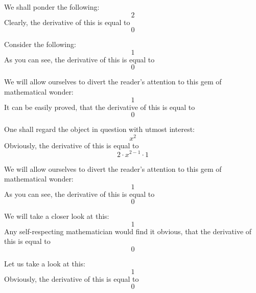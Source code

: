 \documentclass{article}
\begin{document}
We shall ponder the following:
\begin{equation}
2 
\end{equation}
Clearly, the derivative of this is equal to
\begin{equation}
0 
\end{equation}

Consider the following:
\begin{equation}
1 
\end{equation}
As you can see, the derivative of this is equal to
\begin{equation}
0 
\end{equation}

We will allow ourselves to divert the reader's attention to this gem of mathematical wonder:
\begin{equation}
1 
\end{equation}
It can be easily proved, that the derivative of this is equal to
\begin{equation}
0 
\end{equation}

One shall regard the object in question with utmost interest:
\begin{equation}
x ^{2 } 
\end{equation}
Obviously, the derivative of this is equal to
\begin{equation}
2 \cdot x ^{2 - 1 } \cdot 1 
\end{equation}

We will allow ourselves to divert the reader's attention to this gem of mathematical wonder:
\begin{equation}
1 
\end{equation}
As you can see, the derivative of this is equal to
\begin{equation}
0 
\end{equation}

We will take a closer look at this:
\begin{equation}
1 
\end{equation}
Any self-respecting mathematician would find it obvious, that the derivative of this is equal to
\begin{equation}
0 
\end{equation}

Let us take a look at this:
\begin{equation}
1 
\end{equation}
Obviously, the derivative of this is equal to
\begin{equation}
0 
\end{equation}
\end{document}
